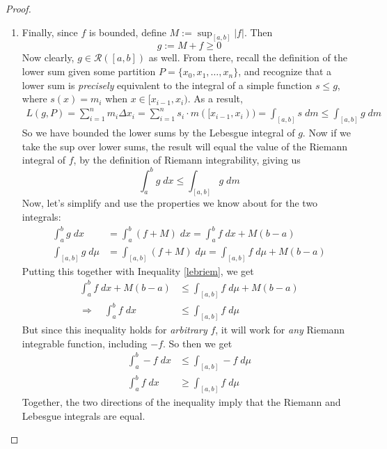 \documentclass[12pt]{article}
\theoremstyle{plain}
\theoremstyle{definition}
\theoremstyle{remark}
\begin{document}
\begin{proof}
\begin{enumerate}
\item Finally, since $f$ is bounded, define $M:=\sup_{[a,b]}|f|$. Then
\[
    g := M+f \geq 0
\]
Now clearly, $g\in\mathscr{R}([a,b])$ as well. From there, recall the definition of the lower sum given some partition $P=\{x_0,x_1,\ldots,x_n\}$, and recognize that a lower sum is \emph{precisely} equivalent to the integral of a simple function $s\leq g$, where $s(x)=m_i$ when $x\in[x_{i-1},x_i)$. As a result,
\begin{align*}
    L(g,P) = \sum^n_{i=1} m_i\Delta x_i
    = \sum^n_{i=1} s_i \cdot m([x_{i-1},x_i))
    = \int_{[a,b]} s \; dm
    \leq \int_{[a,b]} g \; dm
\end{align*}
So we have bounded the lower sums by the Lebesgue integral of $g$. Now if we take the sup over lower sums, the result will equal the value of the Riemann integral of $f$, by the definition of Riemann integrability, giving us
\begin{equation}
    \label{lebriem}
    \int_a^b g \; dx \leq \int_{[a,b]} g \; dm
\end{equation}
Now, let's simplify and use the properties we know about for the two integrals:
\begin{align*}
    \int_a^b g \; dx &= 
    \int_a^b (f+M) \; dx = 
    \int_a^b f \; dx + M(b-a) \\
    \int_{[a,b]} g \; d\mu &= 
    \int_{[a,b]} (f+M) \; d\mu = 
    \int_{[a,b]} f \; d\mu + M(b-a) 
\end{align*}
Putting this together with Inequality \ref{lebriem}, we get
\begin{align*}
    \int_a^b f \; dx + M(b-a) &\leq
    \int_{[a,b]} f \; d\mu + M(b-a) \\
    \Rightarrow\quad
    \int_a^b f \; dx &\leq
    \int_{[a,b]} f \; d\mu
\end{align*}
But since this inequality holds for \emph{arbitrary} $f$, it will work for \emph{any} Riemann integrable function, including $-f$. So then we get
\begin{align*}
    \int_a^b -f \; dx &\leq
    \int_{[a,b]} -f \; d\mu \\
    \int_a^b f \; dx &\geq
    \int_{[a,b]} f \; d\mu 
\end{align*}
Together, the two directions of the inequality imply that the Riemann and Lebesgue integrals are equal.
\end{enumerate}
\end{proof}
\end{document}
